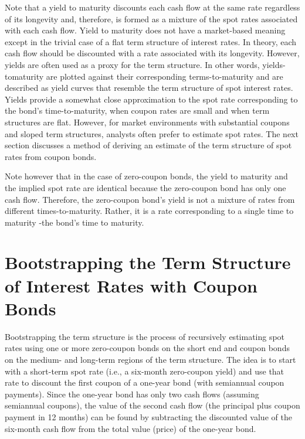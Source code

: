 \documentclass[11pt]{article}
\begin{document}
Note that a yield to maturity discounts each cash flow at the same rate regardless of its longevity and, therefore, is formed as a mixture of the spot rates associated with each cash flow. Yield to maturity does not have a market-based meaning except in the trivial case of a flat term structure of interest rates. In theory, each cash flow should be discounted with a rate associated with its longevity. However, yields are often used as a proxy for the term structure. In other words, yields-tomaturity are plotted against their corresponding terms-to-maturity and are described as yield curves that resemble the term structure of spot interest rates. Yields provide a somewhat close approximation to the spot rate corresponding to the bond's time-to-maturity, when coupon rates are small and when term structures are flat. However, for market environments with substantial coupons and sloped term structures, analysts often prefer to estimate spot rates. The next section discusses a method of deriving an estimate of the term structure of spot rates from coupon bonds.

Note however that in the case of zero-coupon bonds, the yield to maturity and the implied spot rate are identical because the zero-coupon bond has only one cash flow. Therefore, the zero-coupon bond's yield is not a mixture of rates from different times-to-maturity. Rather, it is a rate corresponding to a single time to maturity -the bond's time to maturity.

\section*{Bootstrapping the Term Structure of Interest Rates with Coupon Bonds}
Bootstrapping the term structure is the process of recursively estimating spot rates using one or more zero-coupon bonds on the short end and coupon bonds on the medium- and long-term regions of the term structure. The idea is to start with a short-term spot rate (i.e., a six-month zero-coupon yield) and use that rate to discount the first coupon of a one-year bond (with semiannual coupon payments). Since the one-year bond has only two cash flows (assuming semiannual coupons), the value of the second cash flow (the principal plus coupon payment in 12 months) can be found by subtracting the discounted value of the six-month cash flow from the total value (price) of the one-year bond.
\end{document}
